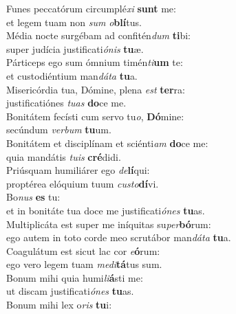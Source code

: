 \oddverse Funes peccatórum circumplé\textit{xi} \textbf{sunt} me:~\*\\
\oddverse et legem tuam non \textit{sum} \textit{o}\textbf{blí}tus.\\
\evenverse Média nocte surgébam ad confitén\textit{dum} \textbf{ti}bi:~\*\\
\evenverse super judícia justificati\textit{ó}\textit{nis} \textbf{tu}æ.\\
\oddverse Párticeps ego sum ómnium timén\textit{ti}\textbf{um} te:~\*\\
\oddverse et custodiéntium man\textit{dá}\textit{ta} \textbf{tu}a.\\
\evenverse Misericórdia tua, Dómine, plena \textit{est} \textbf{ter}ra:~\*\\
\evenverse justificatiónes \textit{tu}\textit{as} \textbf{do}ce me.\\
\oddverse Bonitátem fecísti cum servo tu\textit{o}, \textbf{Dó}mine:~\*\\
\oddverse secúndum \textit{ver}\textit{bum} \textbf{tu}um.\\
\evenverse Bonitátem et disciplínam et sciénti\textit{am} \textbf{do}ce me:~\*\\
\evenverse quia mandátis \textit{tu}\textit{is} \textbf{cré}didi.\\
\oddverse Priúsquam humiliárer ego \textit{de}\textbf{lí}qui:~\*\\
\oddverse proptérea elóquium tuum \textit{cu}\textit{sto}\textbf{dí}vi.\\
\evenverse Bo\textit{nus} \textbf{es} tu:~\*\\
\evenverse et in bonitáte tua doce me justificati\textit{ó}\textit{nes} \textbf{tu}as.\\
\oddverse Multiplicáta est super me iníquitas su\textit{per}\textbf{bó}rum:~\*\\
\oddverse ego autem in toto corde meo scrutábor man\textit{dá}\textit{ta} \textbf{tu}a.\\
\evenverse Coagulátum est sicut lac cor \textit{e}\textbf{ó}rum:~\*\\
\evenverse ego vero legem tuam \textit{me}\textit{di}\textbf{tá}tus sum.\\
\oddverse Bonum mihi quia humi\textit{li}\textbf{á}sti me:~\*\\
\oddverse ut discam justificati\textit{ó}\textit{nes} \textbf{tu}as.\\
\evenverse Bonum mihi lex o\textit{ris} \textbf{tu}i:~\*\\
